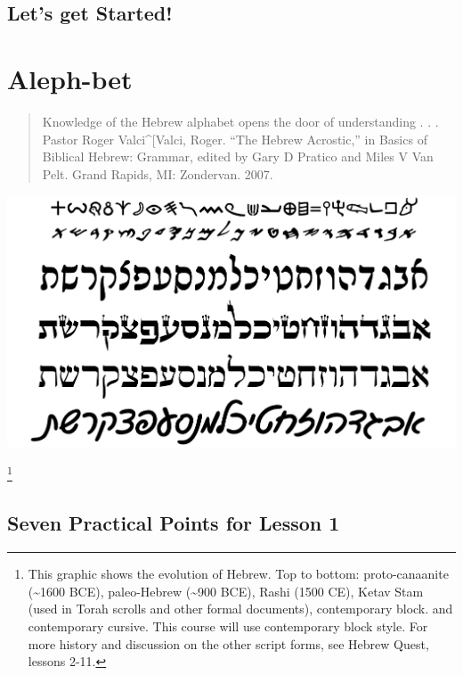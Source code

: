 \documentclass[
]{turabian-researchpaper}
\begin{document}
\hypertarget{lets-get-started}{%
\subsection*{Let's get Started!}\label{lets-get-started}}

\hypertarget{alephbet}{%
\section{Aleph-bet}\label{alephbet}}

\begin{quote}
Knowledge of the Hebrew alphabet opens the door of understanding . . . Pastor Roger Valci\^{}{[}Valci, Roger. ``The Hebrew Acrostic,'' in Basics of Biblical Hebrew: Grammar, edited by Gary D Pratico and Miles V Van Pelt. Grand Rapids, MI: Zondervan. 2007.
\end{quote}

\begin{center}\includegraphics[width=400pt]{images/alephbet_multi} \end{center}

\footnote{This graphic shows the evolution of Hebrew. Top to bottom: proto-canaanite (\textasciitilde1600 BCE), paleo-Hebrew (\textasciitilde900 BCE), Rashi (1500 CE), Ketav Stam (used in Torah scrolls and other formal documents), contemporary block. and contemporary cursive. This course will use contemporary block style. For more history and discussion on the other script forms, see Hebrew Quest, lessons 2-11.}

\hypertarget{seven-practical-points-for-lesson-1}{%
\subsection*{Seven Practical Points for Lesson 1}\label{seven-practical-points-for-lesson-1}}
\end{document}
